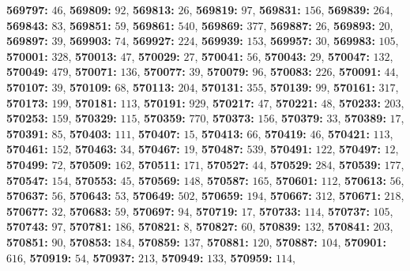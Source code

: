 \textsf{\bfseries 569797:} $46$, \textsf{\bfseries 569809:} $92$, \textsf{\bfseries 569813:} $26$, \textsf{\bfseries 569819:} $97$, \textsf{\bfseries 569831:} $156$, \textsf{\bfseries 569839:} $264$, \textsf{\bfseries 569843:} $83$, \textsf{\bfseries 569851:} $59$, \textsf{\bfseries 569861:} $540$, \textsf{\bfseries 569869:} $377$, \textsf{\bfseries 569887:} $26$, \textsf{\bfseries 569893:} $20$, \textsf{\bfseries 569897:} $39$, \textsf{\bfseries 569903:} $74$, \textsf{\bfseries 569927:} $224$, \textsf{\bfseries 569939:} $153$, \textsf{\bfseries 569957:} $30$, \textsf{\bfseries 569983:} $105$, \textsf{\bfseries 570001:} $328$, \textsf{\bfseries 570013:} $47$, \textsf{\bfseries 570029:} $27$, \textsf{\bfseries 570041:} $56$, \textsf{\bfseries 570043:} $29$, \textsf{\bfseries 570047:} $132$, \textsf{\bfseries 570049:} $479$, \textsf{\bfseries 570071:} $136$, \textsf{\bfseries 570077:} $39$, \textsf{\bfseries 570079:} $96$, \textsf{\bfseries 570083:} $226$, \textsf{\bfseries 570091:} $44$, \textsf{\bfseries 570107:} $39$, \textsf{\bfseries 570109:} $68$, \textsf{\bfseries 570113:} $204$, \textsf{\bfseries 570131:} $355$, \textsf{\bfseries 570139:} $99$, \textsf{\bfseries 570161:} $317$, \textsf{\bfseries 570173:} $199$, \textsf{\bfseries 570181:} $113$, \textsf{\bfseries 570191:} $929$, \textsf{\bfseries 570217:} $47$, \textsf{\bfseries 570221:} $48$, \textsf{\bfseries 570233:} $203$, \textsf{\bfseries 570253:} $159$, \textsf{\bfseries 570329:} $115$, \textsf{\bfseries 570359:} $770$, \textsf{\bfseries 570373:} $156$, \textsf{\bfseries 570379:} $33$, \textsf{\bfseries 570389:} $17$, \textsf{\bfseries 570391:} $85$, \textsf{\bfseries 570403:} $111$, \textsf{\bfseries 570407:} $15$, \textsf{\bfseries 570413:} $66$, \textsf{\bfseries 570419:} $46$, \textsf{\bfseries 570421:} $113$, \textsf{\bfseries 570461:} $152$, \textsf{\bfseries 570463:} $34$, \textsf{\bfseries 570467:} $19$, \textsf{\bfseries 570487:} $539$, \textsf{\bfseries 570491:} $122$, \textsf{\bfseries 570497:} $12$, \textsf{\bfseries 570499:} $72$, \textsf{\bfseries 570509:} $162$, \textsf{\bfseries 570511:} $171$, \textsf{\bfseries 570527:} $44$, \textsf{\bfseries 570529:} $284$, \textsf{\bfseries 570539:} $177$, \textsf{\bfseries 570547:} $154$, \textsf{\bfseries 570553:} $45$, \textsf{\bfseries 570569:} $148$, \textsf{\bfseries 570587:} $165$, \textsf{\bfseries 570601:} $112$, \textsf{\bfseries 570613:} $56$, \textsf{\bfseries 570637:} $56$, \textsf{\bfseries 570643:} $53$, \textsf{\bfseries 570649:} $502$, \textsf{\bfseries 570659:} $194$, \textsf{\bfseries 570667:} $312$, \textsf{\bfseries 570671:} $218$, \textsf{\bfseries 570677:} $32$, \textsf{\bfseries 570683:} $59$, \textsf{\bfseries 570697:} $94$, \textsf{\bfseries 570719:} $17$, \textsf{\bfseries 570733:} $114$, \textsf{\bfseries 570737:} $105$, \textsf{\bfseries 570743:} $97$, \textsf{\bfseries 570781:} $186$, \textsf{\bfseries 570821:} $8$, \textsf{\bfseries 570827:} $60$, \textsf{\bfseries 570839:} $132$, \textsf{\bfseries 570841:} $203$, \textsf{\bfseries 570851:} $90$, \textsf{\bfseries 570853:} $184$, \textsf{\bfseries 570859:} $137$, \textsf{\bfseries 570881:} $120$, \textsf{\bfseries 570887:} $104$, \textsf{\bfseries 570901:} $616$, \textsf{\bfseries 570919:} $54$, \textsf{\bfseries 570937:} $213$, \textsf{\bfseries 570949:} $133$, \textsf{\bfseries 570959:} $114$, 
